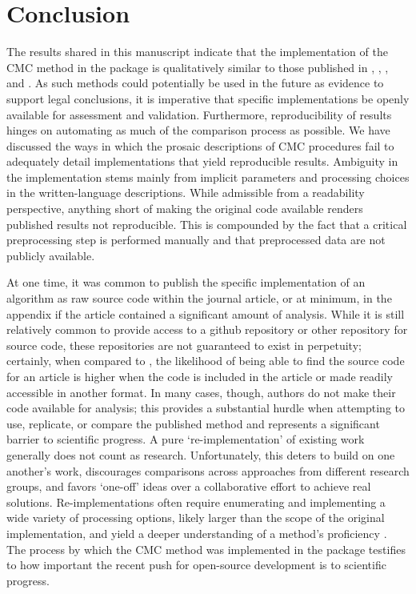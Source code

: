 \hypertarget{conclusion}{%
\section{Conclusion}\label{conclusion}}

The results shared in this manuscript indicate that the implementation
of the CMC method in the  package is qualitatively similar
to those published in \citet{song_3d_2014}, \citet{tong_improved_2015},
\citet{chen_convergence_2017}, and \citet{song_estimating_2018}. As such
methods could potentially be used in the future as evidence to support
legal conclusions, it is imperative that specific implementations be
openly available for assessment and validation. Furthermore,
reproducibility of results hinges on automating as much of the
comparison process as possible. We have discussed the ways in which the
prosaic descriptions of CMC procedures fail to adequately detail
implementations that yield reproducible results. Ambiguity in the
implementation stems mainly from implicit parameters and processing
choices in the written-language descriptions. While admissible from a
readability perspective, anything short of making the original code
available renders published results not reproducible. This is compounded
by the fact that a critical preprocessing step is performed manually and
that preprocessed data are not publicly available.

At one time, it was common to publish the specific implementation of an
algorithm as raw source code \citep{bron_merge_1972} within the journal
article, or at minimum, in the appendix \citep{friend_sorting_1956} if
the article contained a significant amount of analysis. While it is
still relatively common to provide access to a github repository or
other repository for source code, these repositories are not guaranteed
to exist in perpetuity; certainly, when compared to
\citep{bron_merge_1972}, the likelihood of being able to find the source
code for an article is higher when the code is included in the article
or made readily accessible in another format. In many cases, though,
authors do not make their code available for analysis; this provides a
substantial hurdle when attempting to use, replicate, or compare the
published method and represents a significant barrier to scientific
progress. A pure `re-implementation' of existing work generally does not
count as research. Unfortunately, this deters to build on one another's
work, discourages comparisons across approaches from different research
groups, and favors `one-off' ideas over a collaborative effort to
achieve real solutions. Re-implementations often require enumerating and
implementing a wide variety of processing options, likely larger than
the scope of the original implementation, and yield a deeper
understanding of a method's proficiency \citep{Stodden2013SettingTD}.
The process by which the CMC method was implemented in the
 package testifies to how important the recent push for
open-source development is to scientific progress.

